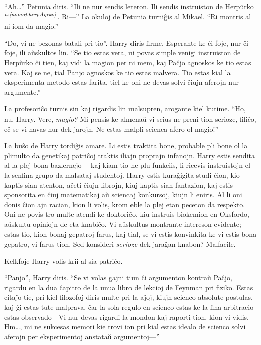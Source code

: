 ``Ah\ldots{}'' Petunia diris. ``Ili ne nur sendis leteron. Ili sendis
instruiston de Herpŭrko$^{\textit{n:\ref{nomoj:herpŭrko}}}$. Ri—'' La okuloj de Petunia
turniĝis al Mikael. ``Ri montris al ni iom da magio.''

``Do, vi ne bezonas batali pri tio''. Harry diris firme. Esperante ke
ĉi-foje, nur ĉi-foje, ili aŭskultos lin. ``Se tio estas vera, ni povas
simple venigi instruiston de Herpŭrko ĉi tien, kaj vidi la magion per
ni mem, kaj Paĉjo agnoskos ke tio estas vera. Kaj se ne, tial Panjo
agnoskos ke tio estas malvera. Tio estas kial la eksperimenta metodo
estas farita, tiel ke oni ne devas solvi ĉiujn aferojn nur
argumente.''

La profesoriĉo turnis sin kaj rigardis lin malsupren, arogante kiel
kutime.  ``Ho, nu, Harry. Vere, \emph{magio?} Mi pensis ke almenaŭ vi scius
ne preni tion serioze, filiĉo, eĉ se vi havas nur dek jarojn. Ne estas
malpli scienca afero ol magio!''

La buŝo de Harry tordiĝis amare. Li estis traktita bone, probable pli
bone ol la plimulto da genetikaj patriĉoj traktis iliajn proprajn
infanojn. Harry estis sendita al la plej bona bazlernejo— kaj kiam
tio ne plu funkciis, li ricevis instruistojn el la senfina grupo da
malsataj studentoj. Harry estis kuraĝigita studi ĉion, kio kaptis sian
atenton, aĉeti ĉiujn librojn, kiuj kaptis sian fantazion, kaj estis
sponsorita en ĉiuj matematikaj aŭ sciencaj konkursoj, kiujn li
eniris. Al li oni donis ĉion ajn racian, kion li volis, krom eble
la plej etan peceton da respekto. Oni ne povis tro multe atendi ke
doktoriĉo, kiu instruis biokemion en Oksfordo, aŭskultu opiniojn de
eta knabiĉo. Vi aŭskultus montrante intereson evidente; estas tio,
kion bonaj gepatroj farus, kaj tial, se vi estis konvinkita ke vi
estis bona gepatro, vi farus tion. Sed konsideri \emph{serioze}
dek-jaraĝan knabon? Malfacile.

Kelkfoje Harry volis krii al sia patriĉo.

``Panjo'', Harry diris. ``Se vi volas gajni tiun ĉi argumenton kontraŭ
Paĉjo, rigardu en la dua ĉapitro de la unua libro de lekcioj de
Feynman pri fiziko. Estas citaĵo tie, pri kiel filozofoj diris multe
pri la aĵoj, kiujn scienco absolute postulas, kaj ĝi estas tute
malprava, ĉar la sola regulo en scienco estas ke la fina arbitracio
estas observado—Vi nur devas rigardi la mondon kaj raporti tion, kion
vi vidis. Hm\ldots{}, mi ne sukcesas memori kie trovi ion pri kial
estas idealo de scienco solvi aferojn per eksperimentoj anstataŭ
argumentoj—''

